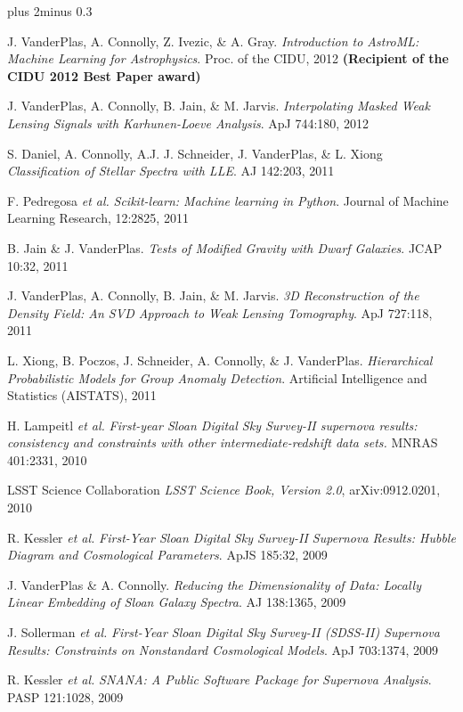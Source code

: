 \documentclass{article} %
\def\bf{\bfseries}
\def\sf{\sffamily}
\def\sl{\slshape}
\newlength\sidebarwidth
\newcommand{\smalltopic}[2]%
	 {\pagebreak[2]%
	 \vskip 1\baselineskip plus 2\baselineskip minus 0.3\baselineskip
	 \begin{minipage}{\textwidth}
         \phantomsection\addcontentsline{toc}{subsection}{#1}%
         \nopagebreak\hspace{0in}%
         \nopagebreak\begin{minipage}[t]{\sidebarwidth - .2cm}
         \raggedleft \bf\sf %
	 \textcolor{dark_blue}{\large #1}%
	 \end{minipage}%
	 \hfill
	 \begin{minipage}[t]{\linewidth - \sidebarwidth}
	 \nopagebreak{%
	    \rule{\linewidth}{.5pt}%
	    \vspace{.1\baselineskip}%
	    }%
	    #2
	 \end{minipage}
	 \end{minipage}}
\begin{document}
\smalltopic{}{

  \begin{itemize}[leftmargin=0ex, itemsep=0ex, parsep=.5ex, labelindent=-4ex]

    \publication
      J. VanderPlas, A. Connolly, Z. Ivezic, \& A. Gray.
      {\sl Introduction to AstroML: Machine Learning for Astrophysics}.
      Proc. of the CIDU, 2012
      {\bf (Recipient of the CIDU 2012 Best Paper award)}

    \publication
      J. VanderPlas, A. Connolly, B. Jain, \& M. Jarvis.
      {\it Interpolating Masked Weak Lensing Signals with Karhunen-Loeve
        Analysis}.
      ApJ 744:180, 2012

    \publication
      S. Daniel, A. Connolly, A.J. J. Schneider, J. VanderPlas, \& L. Xiong
      {\sl Classification of Stellar Spectra with LLE}.
      AJ 142:203, 2011

    \publication
      F. Pedregosa {\sl et al.}
      {\sl Scikit-learn: Machine learning in Python}.
      Journal of Machine Learning Research, 12:2825, 2011

    \publication
      B. Jain \& J. VanderPlas.
      {\sl Tests of Modified Gravity with Dwarf Galaxies}.
      JCAP 10:32, 2011

    \publication
      J. VanderPlas, A. Connolly, B. Jain, \& M. Jarvis.
      {\sl 3D Reconstruction of the Density Field: An SVD Approach
        to Weak Lensing Tomography}.
      ApJ 727:118, 2011

    \publication
      L. Xiong, B. Poczos, J. Schneider, A. Connolly, \& J. VanderPlas.
      {\sl Hierarchical Probabilistic Models for Group Anomaly Detection}.
      Artificial Intelligence and Statistics (AISTATS), 2011


    \publication
      H. Lampeitl {\sl et al.}
      {\sl First-year Sloan Digital Sky Survey-II supernova results:
      consistency and constraints with other intermediate-redshift data sets.}
      MNRAS 401:2331, 2010

    \publication
      LSST Science Collaboration
      {\sl LSST Science Book, Version 2.0}, arXiv:0912.0201, 2010

    \publication
      R. Kessler {\it et al.}
      {\it First-Year Sloan Digital Sky Survey-II Supernova Results:
      Hubble Diagram and Cosmological Parameters}.
      ApJS 185:32, 2009

    \publication
      J. VanderPlas \& A. Connolly.
      {\it Reducing the Dimensionality of Data: Locally
      Linear Embedding of Sloan Galaxy Spectra}.
      AJ 138:1365, 2009

    \publication
      J. Sollerman {\sl et al.}
      {\it First-Year Sloan Digital Sky Survey-II (SDSS-II) Supernova
      Results: Constraints on Nonstandard Cosmological Models}.
      ApJ 703:1374, 2009

    \publication
      R. Kessler {\it et al.}
      {\it SNANA: A Public Software Package for Supernova Analysis}.
      PASP 121:1028, 2009

  \end{itemize}
}
\end{document}
